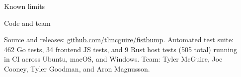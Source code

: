 \documentclass[final]{beamer}
\newlength{\sepwidth}
\newlength{\colwidth}
\newcommand{\separatorcolumn}{\begin{column}{\sepwidth}\end{column}}
\begin{document}
\begin{frame}[t]
\begin{columns}[t]
\begin{column}{\colwidth}
\begin{alertblock}{Known limits}
  \end{alertblock}

  \begin{block}{Code and team}

    Source and releases: \href{https://github.com/tlmcguire/fistbump}{github.com/tlmcguire/fistbump}.
    Automated test suite: 462 Go tests, 34 frontend JS tests, and 9 Rust host tests
    (505 total) running in CI across Ubuntu, macOS, and Windows.
    Team: Tyler McGuire, Joe Cooney, Tyler Goodman, and Aron Magnusson.

  \end{block}

\end{column}

\separatorcolumn
\end{columns}
\end{frame}
\end{document}
